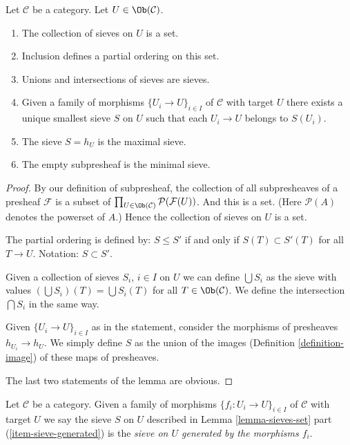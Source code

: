 \begin{lemma}
\label{lemma-sieves-set}
Let $\mathcal{C}$ be a category. Let $U \in \Ob(\mathcal{C})$.
\begin{enumerate}
\item The collection of sieves on $U$ is a set.
\item Inclusion defines a partial ordering on this set.
\item Unions and intersections of sieves are sieves.
\item
\label{item-sieve-generated}
Given a family of morphisms $\{U_i \to U\}_{i\in I}$
of $\mathcal{C}$ with target $U$
there exists a unique smallest sieve $S$ on $U$ such that
each $U_i \to U$ belongs to $S(U_i)$.
\item The sieve $S = h_U$ is the maximal sieve.
\item The empty subpresheaf is the minimal sieve.
\end{enumerate}
\end{lemma}

\begin{proof}
By our definition of subpresheaf, the collection of
all subpresheaves of a presheaf $\mathcal{F}$ is a subset of
$\prod_{U \in \Ob(\mathcal{C})} \mathcal{P}(\mathcal{F}(U))$.
And this is a set. (Here $\mathcal{P}(A)$ denotes
the powerset of $A$.) Hence the collection of sieves on $U$
is a set.

\medskip\noindent
The partial ordering is defined by: $S \leq S'$ if and only if
$S(T) \subset S'(T)$ for all $T \to U$. Notation: $S \subset S'$.

\medskip\noindent
Given a collection of sieves $S_i$, $i \in I$ on $U$ we can
define $\bigcup S_i$ as the sieve with values
$(\bigcup S_i)(T) = \bigcup S_i(T)$ for all
$T \in \Ob(\mathcal{C})$.
We define the intersection $\bigcap S_i$ in the same way.

\medskip\noindent
Given $\{U_i \to U\}_{i\in I}$ as in the statement, consider
the morphisms of presheaves $h_{U_i} \to h_U$. We simply
define $S$ as the union of the images (Definition \ref{definition-image})
of these maps of presheaves.

\medskip\noindent
The last two statements of the lemma are obvious.
\end{proof}

\begin{definition}
\label{definition-sieve-generated}
Let $\mathcal{C}$ be a category.
Given a family of morphisms $\{f_i : U_i \to U\}_{i\in I}$
of $\mathcal{C}$ with target $U$ we say the sieve
$S$ on $U$ described in Lemma \ref{lemma-sieves-set}
part (\ref{item-sieve-generated}) is the {\it sieve  on $U$
generated by the morphisms $f_i$}.
\end{definition}

